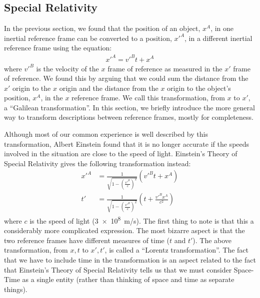 \subsection{Special Relativity}
In the previous section, we found that the position of an object, $x^A$, in one inertial reference frame can be converted to a position, $x'^A$, in a different inertial reference frame using the equation:
\begin{align*}
x'^A=v'^Bt+x^A
\end{align*}
where $v'^B$ is the velocity of the $x$ frame of reference as measured in the $x'$ frame of reference. We found this by arguing that we could sum the distance from the $x'$ origin to the $x$ origin and the distance from the $x$ origin to the object's position, $x^A$, in the $x$ reference frame. We call this transformation, from $x$ to $x'$, a ``Galilean transformation''. In this section, we briefly introduce the more general way to transform descriptions between reference frames, mostly for completeness.

Although most of our common experience is well described by this transformation, Albert Einstein found that it is no longer accurate if the speeds involved in the situation are close to the speed of light. Einstein's Theory of Special Relativity gives the following transformation instead:
\begin{align}
\label{eqn:chap3:LorentzTr}
x'^A&=\frac{1}{\sqrt{1-\left(\frac{v'^B}{c}\right)^2}}(v'^Bt+x^A)\\
t'&=\frac{1}{\sqrt{1-\left(\frac{v'^B}{c}\right)^2}}\left(  t+\frac{v'^Bx^A}{c^2} \right)
\end{align}
where $c$ is the speed of light (\SI{3e8}{m/s}). The first thing to note is that this a considerably more complicated expression. The most bizarre aspect is that the two reference frames have different measures of time ($t$ and $t'$). The above transformation, from $x,t$ to $x',t'$, is called a ``Lorentz transformation''. The fact that we have to include time in the transformation is an aspect related to the fact that Einstein's Theory of Special Relativity tells us that we must consider Space-Time as a single entity (rather than thinking of space and time as separate things).

